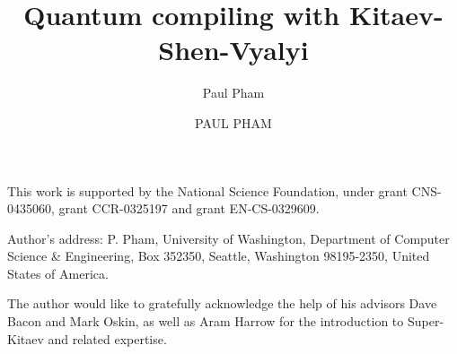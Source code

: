 \documentclass[prodmode,acmtecs]{acmsmall}
\title{Quantum compiling with Kitaev-Shen-Vyalyi}
\author{Paul Pham}
\begin{document}
\newcommand{\braket}[2]{\langle #1|#2 \rangle}
\newcommand{\normtwo}{\frac{1}{\sqrt{2}}}
\newcommand{\norm}[1]{\parallel #1 \parallel}


\title{}
\author{PAUL PHAM
}





\begin{bottomstuff}
This work is supported by the National Science Foundation, under
grant CNS-0435060, grant CCR-0325197 and grant EN-CS-0329609.

Author's address: P. Pham, University of Washington,
Department of Computer Science \& Engineering,
Box 352350, Seattle, Washington 98195-2350, United States of America.
\end{bottomstuff}


\maketitle




















\begin{acks}
The author would like to gratefully acknowledge the help of
his advisors Dave Bacon and Mark Oskin,
as well as Aram Harrow for the introduction to
Super-Kitaev and related expertise.
\end{acks}




\end{document}
